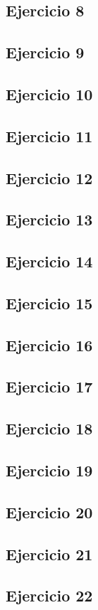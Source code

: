 \documentclass[10pt,a4paper]{article}
\begin{document}
  \subsection{Ejercicio 8}
  \subsection{Ejercicio 9}
  \subsection{Ejercicio 10}
  \subsection{Ejercicio 11}
  \subsection{Ejercicio 12}
  \subsection{Ejercicio 13}
  \subsection{Ejercicio 14}
  \subsection{Ejercicio 15}
  \subsection{Ejercicio 16}
  \subsection{Ejercicio 17}
  \subsection{Ejercicio 18}
  \subsection{Ejercicio 19}
  \subsection{Ejercicio 20}
  \subsection{Ejercicio 21}
  \subsection{Ejercicio 22}
\end{document}
